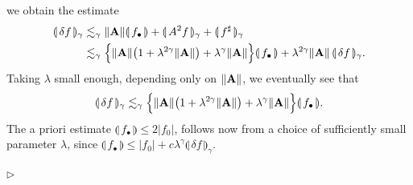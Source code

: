 \documentclass[11pt,a4paper]{amsart}
\renewcommand{\leq}{\leqslant}
\numberwithin{equation}{section} %
\newenvironment{Dem}{%
    \begin{list}{\hspace{0.5cm}{\sc Proof --}}{%
        \setlength{\topsep}{0pt}%
        \setlength{\leftmargin}{0pt}%
        \setlength{\rightmargin}{0pt}%
        \setlength{\listparindent}{0pt}%
        \setlength{\itemindent}{0pt}%
        \setlength{\parsep}{0pt}%
        \addtolength{\leftmargin}{20pt}%
        \addtolength{\rightmargin}{0pt}%
    } \item }{\hfill{\space $\rhd$}\end{list}\smallskip}
\begin{document}
\begin{Dem}
$$$$
we obtain the estimate
\begin{equation*}
\begin{split}
\llparenthesis\, \delta f \,\rrparenthesis_\gamma &\lesssim_{\gamma} \| {\bf A} \|\llparenthesis\,f_\bullet \,\rrparenthesis + \llparenthesis\, A^2 f\,\rrparenthesis_\gamma + \llparenthesis\, f^{\sharp}\,\rrparenthesis_\gamma \\
                            &\lesssim_{\gamma} \Big\{\| {\bf A} \| \big(1 + \lambda^{2 \gamma}\| {\bf A} \|\big) + \lambda^\gamma \| {\bf A} \|\Big\} \llparenthesis\, f_\bullet \,\rrparenthesis + \lambda^{2 \gamma}\| {\bf A} \|\,\llparenthesis\, \delta f \,\rrparenthesis_{\gamma}.
\end{split}
\end{equation*}
Taking $\lambda$ small enough, depending only on $\| \bf A \|$, we eventually see that 
$$ 
\llparenthesis\,\delta f \,\rrparenthesis_\gamma \lesssim_{\gamma}\Big\{\| {\bf A} \| \big(1 +  \lambda^{2 \gamma} \| {\bf A} \|\big) + \lambda^\gamma  \| {\bf A} \|\Big\} \llparenthesis\, f_\bullet\,\rrparenthesis.
$$
The a priori estimate $\llparenthesis\, f _\bullet\,\rrparenthesis \leqslant 2 | f_0 |$, follows now from a choice of sufficiently small  parameter $\lambda$, since $\llparenthesis\,f_\bullet \,\rrparenthesis \leq | f_0 | + c \lambda^\gamma \llparenthesis\, \delta f \,\rrparenthesis _\gamma$.

\bigskip


\end{Dem}
\end{document}
